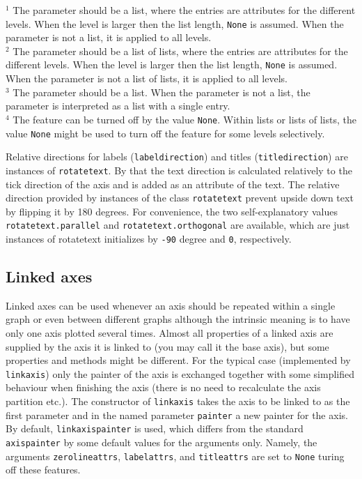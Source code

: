 $^1$
The parameter should be a list, where the entries are attributes
for the different levels. When the level is larger then the list
length, \verb|None| is assumed. When the parameter is not a list,
it is applied to all levels.\\
$^2$
The parameter should be a list of lists, where the entries are
attributes for the different levels. When the level is larger then the
list length, \verb|None| is assumed. When the parameter is not a
list of lists, it is applied to all levels.\\
$^3$
The parameter should be a list. When the parameter is not a
list, the parameter is interpreted as a list with a single
entry.\\
$^4$
The feature can be turned off by the value \verb|None|. Within
lists or lists of lists, the value \verb|None| might be
used to turn off the feature for some levels selectively.
\medskip

Relative directions for labels (\verb|labeldirection|) and titles
(\verb|titledirection|) are instances of \verb|rotatetext|. By that
the text direction is calculated relatively to the tick direction of
the axis and is added as an attribute of the text. The relative
direction provided by instances of the class \verb|rotatetext| prevent
upside down text by flipping it by 180 degrees. For convenience, the
two self-explanatory values \verb|rotatetext.parallel| and
\verb|rotatetext.orthogonal| are available, which are just instances of
rotatetext initializes by \verb|-90| degree and \verb|0|,
respectively.

\subsection{Linked axes}

Linked axes can be used whenever an axis should be repeated within a
single graph or even between different graphs although the intrinsic
meaning is to have only one axis plotted several times. Almost all
properties of a linked axis are supplied by the axis it is linked to
(you may call it the base axis), but some properties and methods might
be different. For the typical case (implemented by \verb|linkaxis|)
only the painter of the axis is exchanged together with some
simplified behaviour when finishing the axis (there is no need to
recalculate the axis partition etc.). The constructor of
\verb|linkaxis| takes the axis to be linked to as the first parameter
and in the named parameter \verb|painter| a new painter for the axis.
By default, \verb|linkaxispainter| is used, which differs from the
standard \verb|axispainter| by some default values for the arguments
only. Namely, the arguments \verb|zerolineattrs|, \verb|labelattrs|,
and \verb|titleattrs| are set to \verb|None| turing off these
features.

